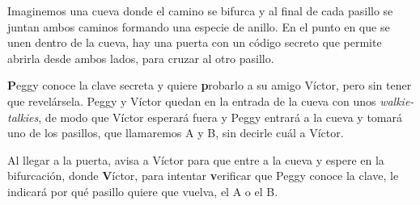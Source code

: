 \hfil

Imaginemos una cueva donde el camino se bifurca y al final de cada pasillo se juntan ambos caminos formando una especie de anillo. En el punto en que se unen dentro de la cueva, hay una puerta con un código secreto que permite abrirla desde ambos lados, para cruzar al otro pasillo.

\textbf{P}eggy conoce la clave secreta y quiere \textbf{p}robarlo a su amigo Víctor, pero sin tener que revelársela.
Peggy y Víctor quedan en la entrada de la cueva con unos \textit{walkie-talkies}, de modo que Víctor esperará fuera y Peggy entrará a la cueva y tomará uno de los pasillos, que llamaremos A y B, sin decirle cuál a Víctor.


Al llegar a la puerta, avisa a Víctor para que entre a la cueva y espere en la bifurcación, donde \textbf{V}íctor, para intentar \textbf{v}erificar que Peggy conoce la clave, le indicará por qué pasillo quiere que vuelva, el A o el B.



